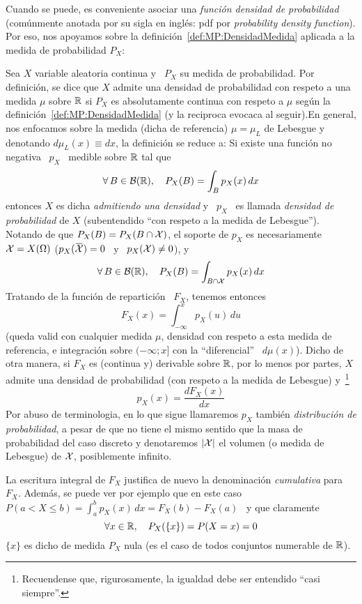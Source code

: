 Cuando  se  puede,  es  conveniente  asociar  una  {\it  funci\'on  densidad  de
  probabilidad} (com\'unmente  anotada por  su sigla en  ingl\'es: pdf  por {\it
  probability   density   function}).   Por   eso,   nos   apoyamos   sobre   la
definici\'on~\ref{def:MP:DensidadMedida}  aplicada a  la medida  de probabilidad
$P_X$:
%
\begin{definicion}
  Sea $X$ variable  aleatoria continua y \ $P_X$ su  medida de probabilidad. Por
  definici\'on, se dice que $X$  admite una densidad de probabilidad con respeto
  a  una medida  $\mu$  sobre $\mathbb{R}$  si  $P_X$ es  absolutamente continua  con
  respeto  a  $\mu$ seg\'un  la  definici\'on~\ref{def:MP:DensidadMedida} (y  la
  reciproca  evocaca al  seguir).\newline  En general,  nos  enfocamos sobre  la
  medida (dicha de referencia) $\mu  = \mu_L$ de Lebesgue y denotando $d\mu_L(x)
  \equiv dx$, la definici\'on se reduce a: Si existe una funci\'on no negativa \
  $p_X$ \ medible sobre $\mathbb{R}$ tal que
  \[
  \forall \, B \in \mathcal{B}(\mathbb{R}), \quad P_X(B) = \int_B p_X(x) \, dx
  \]
  entonces $X$  es dicha {\it  admitiendo una densidad}  y \ $p_X$ \  es llamada
  {\it densidad de probabilidad} de  $X$ (subentendido ``con respeto a la medida
  de Lebesgue'').  Notando de que $P_X(B) = P_X(B \cap \mathcal{X})$, el soporte de $p_X$
  es necesariamente $\mathcal{X} = X(\Omega)$ (\ie $p_X(\widebar{\X}) = 0$ \ y \ $p_X(\mathcal{X})
  \ne 0$), y
  \[
  \forall \, B \in \mathcal{B}(\mathbb{R}), \quad P_X(B) = \int_{B \cap \mathcal{X}} p_X(x) \, dx
  \]
  Tratando de la funci\'on de repartici\'on \ $F_X$, tenemos entonces
  \[
  F_X(x) = \int_{-\infty}^x p_X(u) \, du
  \]
  (queda valid con cualquier medida $\mu$, densidad con respeto a esta medida de
  referencia,  e integraci\'on  sobre $(-\infty;  x]$ con  la  ``diferencial'' \
  $d\mu(x)$).  Dicho  de otra manera, si  $F_X$ es (continua  y) derivable sobre
  $\mathbb{R}$, por lo menos por partes, $X$ admite una densidad de probabilidad (con
  respeto a  la medida de Lebesgue)  y~\footnote{Recuendense que, rigurosamente,
    la igualdad debe ser entendido ``casi siempre''.}
  \[
  p_X(x) = \frac{d F_X(x)}{dx}
  \]
  Por abuso  de terminologia,  en lo que  sigue llamaremos $p_X$  tambi\'en {\it
    distribuci\'on de  probabilidad}, a pesar de  que no tiene  el mismo sentido
  que la masa de probabilidad del  caso discreto y denotaremos $|\mathcal{X}|$ el volumen
  (o medida de Lebesgue) de $\mathcal{X}$, posiblemente infinito.
\end{definicion}
%
La  escritura  integral de  $F_X$  justifica  de  nuevo la  denominaci\'on  {\it
  cumulativa} para  $F_X$. Adem\'as, se puede  ver por ejemplo que  en este caso
$\displaystyle P(a < X \le b) = \int_a^b p_X(x) \, dx = F_X(b) - F_X(a)$ \ y que
claramente
%
\[
\forall x \in \mathbb{R}, \quad P_X(\{x\}) = P(X = x) = 0
\]
%
$\{ x \}$ es dicho de medida $P_X$ nula (es el caso de todos conjuntos numerable
de $\mathbb{R}$).

